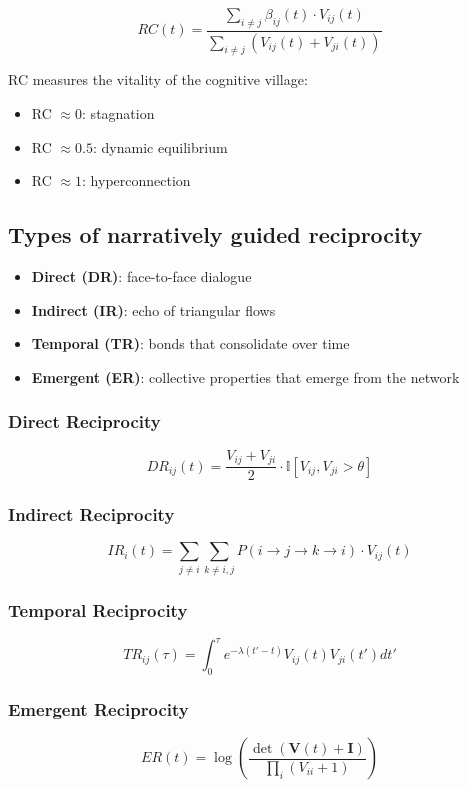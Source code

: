 \[
RC(t) = \frac{\sum_{i\neq j} \beta_{ij}(t) \cdot V_{ij}(t)}{\sum_{i\neq j} (V_{ij}(t) + V_{ji}(t))}
\]

RC measures the vitality of the cognitive village:
\begin{itemize}
	\item RC $\approx 0$: stagnation
	\item RC $\approx 0.5$: dynamic equilibrium
	\item RC $\approx 1$: hyperconnection
\end{itemize}

\subsection{Types of narratively guided reciprocity}
\begin{itemize}
	\item \textbf{Direct (DR)}: face-to-face dialogue
	\item \textbf{Indirect (IR)}: echo of triangular flows
	\item \textbf{Temporal (TR)}: bonds that consolidate over time
	\item \textbf{Emergent (ER)}: collective properties that emerge from the network
\end{itemize}

\subsubsection{Direct Reciprocity}
\[
DR_{ij}(t) = \frac{V_{ij}+V_{ji}}{2} \cdot \mathbb{I}[V_{ij},V_{ji}>\theta]
\]

\subsubsection{Indirect Reciprocity}
\[
IR_i(t) = \sum_{j\neq i}\sum_{k\neq i,j} P(i \rightarrow j \rightarrow k \rightarrow i) \cdot V_{ij}(t)
\]

\subsubsection{Temporal Reciprocity}
\[
TR_{ij}(\tau) = \int_0^\tau e^{-\lambda(t'-t)} V_{ij}(t) V_{ji}(t') dt'
\]

\subsubsection{Emergent Reciprocity}
\[
ER(t) = \log\left(\frac{\det(\mathbf{V}(t)+\mathbf{I})}{\prod_i(V_{ii}+1)}\right)
\]

